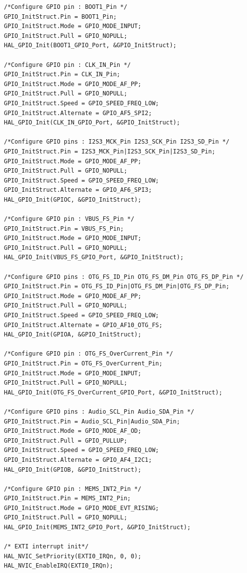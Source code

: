 \documentclass[12pt]{report}
\begin{document}
\begin{appendix}
\begin{lstlisting}[basicstyle=\scriptsize\ttfamily]
/*Configure GPIO pin : BOOT1_Pin */
GPIO_InitStruct.Pin = BOOT1_Pin;
GPIO_InitStruct.Mode = GPIO_MODE_INPUT;
GPIO_InitStruct.Pull = GPIO_NOPULL;
HAL_GPIO_Init(BOOT1_GPIO_Port, &GPIO_InitStruct);

/*Configure GPIO pin : CLK_IN_Pin */
GPIO_InitStruct.Pin = CLK_IN_Pin;
GPIO_InitStruct.Mode = GPIO_MODE_AF_PP;
GPIO_InitStruct.Pull = GPIO_NOPULL;
GPIO_InitStruct.Speed = GPIO_SPEED_FREQ_LOW;
GPIO_InitStruct.Alternate = GPIO_AF5_SPI2;
HAL_GPIO_Init(CLK_IN_GPIO_Port, &GPIO_InitStruct);

/*Configure GPIO pins : I2S3_MCK_Pin I2S3_SCK_Pin I2S3_SD_Pin */
GPIO_InitStruct.Pin = I2S3_MCK_Pin|I2S3_SCK_Pin|I2S3_SD_Pin;
GPIO_InitStruct.Mode = GPIO_MODE_AF_PP;
GPIO_InitStruct.Pull = GPIO_NOPULL;
GPIO_InitStruct.Speed = GPIO_SPEED_FREQ_LOW;
GPIO_InitStruct.Alternate = GPIO_AF6_SPI3;
HAL_GPIO_Init(GPIOC, &GPIO_InitStruct);

/*Configure GPIO pin : VBUS_FS_Pin */
GPIO_InitStruct.Pin = VBUS_FS_Pin;
GPIO_InitStruct.Mode = GPIO_MODE_INPUT;
GPIO_InitStruct.Pull = GPIO_NOPULL;
HAL_GPIO_Init(VBUS_FS_GPIO_Port, &GPIO_InitStruct);

/*Configure GPIO pins : OTG_FS_ID_Pin OTG_FS_DM_Pin OTG_FS_DP_Pin */
GPIO_InitStruct.Pin = OTG_FS_ID_Pin|OTG_FS_DM_Pin|OTG_FS_DP_Pin;
GPIO_InitStruct.Mode = GPIO_MODE_AF_PP;
GPIO_InitStruct.Pull = GPIO_NOPULL;
GPIO_InitStruct.Speed = GPIO_SPEED_FREQ_LOW;
GPIO_InitStruct.Alternate = GPIO_AF10_OTG_FS;
HAL_GPIO_Init(GPIOA, &GPIO_InitStruct);

/*Configure GPIO pin : OTG_FS_OverCurrent_Pin */
GPIO_InitStruct.Pin = OTG_FS_OverCurrent_Pin;
GPIO_InitStruct.Mode = GPIO_MODE_INPUT;
GPIO_InitStruct.Pull = GPIO_NOPULL;
HAL_GPIO_Init(OTG_FS_OverCurrent_GPIO_Port, &GPIO_InitStruct);

/*Configure GPIO pins : Audio_SCL_Pin Audio_SDA_Pin */
GPIO_InitStruct.Pin = Audio_SCL_Pin|Audio_SDA_Pin;
GPIO_InitStruct.Mode = GPIO_MODE_AF_OD;
GPIO_InitStruct.Pull = GPIO_PULLUP;
GPIO_InitStruct.Speed = GPIO_SPEED_FREQ_LOW;
GPIO_InitStruct.Alternate = GPIO_AF4_I2C1;
HAL_GPIO_Init(GPIOB, &GPIO_InitStruct);

/*Configure GPIO pin : MEMS_INT2_Pin */
GPIO_InitStruct.Pin = MEMS_INT2_Pin;
GPIO_InitStruct.Mode = GPIO_MODE_EVT_RISING;
GPIO_InitStruct.Pull = GPIO_NOPULL;
HAL_GPIO_Init(MEMS_INT2_GPIO_Port, &GPIO_InitStruct);

/* EXTI interrupt init*/
HAL_NVIC_SetPriority(EXTI0_IRQn, 0, 0);
HAL_NVIC_EnableIRQ(EXTI0_IRQn);
	\end{lstlisting}
	

\end{appendix}
\end{document}
